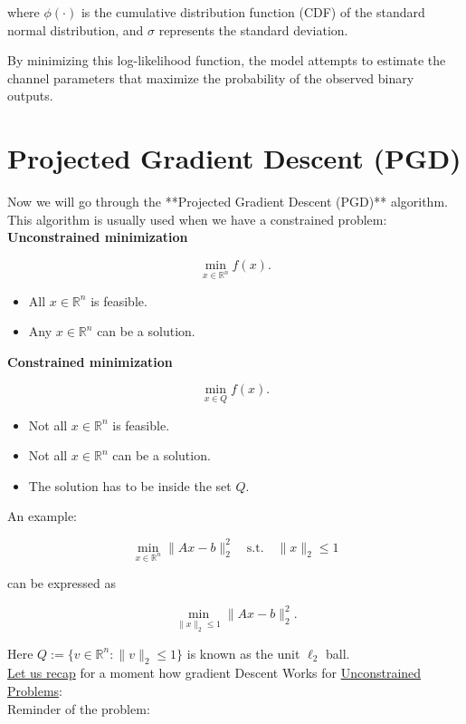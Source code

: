 \documentclass{article}
\begin{document}
where \( \phi(\cdot) \) is the cumulative distribution function (CDF) of the standard normal distribution, and \( \sigma \) represents the standard deviation.

By minimizing this log-likelihood function, the model attempts to estimate the channel parameters that maximize the probability of the observed binary outputs.

\section{Projected Gradient Descent (PGD)}
Now we will go through the **Projected Gradient Descent (PGD)** algorithm. This algorithm is usually used when we have a constrained problem: \\
\noindent
\textbf{Unconstrained minimization}

\[
\min_{x \in \mathbb{R}^n} f(x).
\]

\begin{itemize}
    \item All $x \in \mathbb{R}^n$ is feasible.
    \item Any $x \in \mathbb{R}^n$ can be a solution.
\end{itemize}

\vspace{0.5cm}

\noindent
\textbf{Constrained minimization}

\[
\min_{x \in Q} f(x).
\]

\begin{itemize}
    \item Not all $x \in \mathbb{R}^n$ is feasible.
    \item Not all $x \in \mathbb{R}^n$ can be a solution.
    \item The solution has to be inside the set $Q$.
\end{itemize}

An example:

\[
\min_{x \in \mathbb{R}^n} \|Ax - b\|_2^2 \quad \text{s.t.} \quad \|x\|_2 \leq 1
\]

can be expressed as

\[
\min_{\|x\|_2 \leq 1} \|Ax - b\|_2^2.
\]

Here $Q := \{v \in \mathbb{R}^n : \|v\|_2 \leq 1\}$ is known as the unit $\ell_2$ ball.\\ 

\underline{Let us recap} for a moment how gradient Descent Works for \underline{Unconstrained Problems}:\\
Reminder of the problem: 
\end{document}
